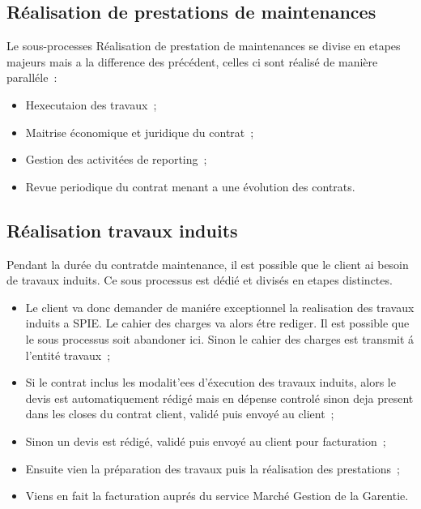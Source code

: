 \subsection{R\'ealisation de prestations de maintenances}

Le sous-processes R\'ealisation de prestation de maintenances se divise en etapes majeurs mais a la difference
des pr\'ec\'edent, celles ci sont r\'ealis\'e de mani\`ere parall\'ele~:

\begin{itemize}
    \item Hexecutaion des travaux~;
    \item Maitrise \'economique et juridique du contrat~;
    \item Gestion des activit\'ees de reporting~;
    \item Revue periodique du contrat menant a une \'evolution des contrats.
\end{itemize}

\subsection{R\'ealisation travaux induits}

Pendant la dur\'ee du contratde maintenance, il est possible que le client ai besoin de travaux induits.
Ce sous processus est d\'edi\'e et divis\'es en etapes distinctes.

\begin{itemize}
    \item Le client va donc demander de mani\'ere exceptionnel la realisation des travaux induits a
    SPIE. Le cahier des charges va alors \'etre rediger. Il est possible que le sous processus soit
    abandoner ici. Sinon le cahier des charges est transmit \'a l'entit\'e travaux~;
    \item Si le contrat inclus les modalit'ees d'\'execution des travaux induits, alors le devis est
    automatiquement r\'edig\'e mais en d\'epense control\'e sinon deja present dans les closes du
    contrat client, valid\'e puis envoy\'e au client~;
    \item Sinon un devis est r\'edig\'e, valid\'e puis envoy\'e au client pour facturation~;
    \item Ensuite vien la pr\'eparation des travaux puis la r\'ealisation des prestations~;
    \item Viens en fait la facturation aupr\'es du service March\'e Gestion de la Garentie.
\end{itemize}

